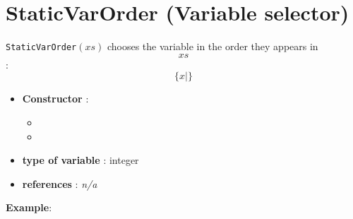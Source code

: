 \section{StaticVarOrder (Variable selector)}\label{staticvarorder:staticvarordervarselector}\hypertarget{staticvarorder:staticvarordervarselector}{}
\begin{notedef}
  \texttt{StaticVarOrder}$(xs)$ chooses the variable in the order they appears in $$xs$$:
$$\{x | \}$$
\end{notedef}

\begin{itemize}
	\item \textbf{Constructor} : 
	\begin{itemize}
	\item {}
	\item {}
	\end{itemize}	
	\item \textbf{type of variable} : integer
	\item \textbf{references} : \emph{n/a}
\end{itemize}

\textbf{Example}:
%

